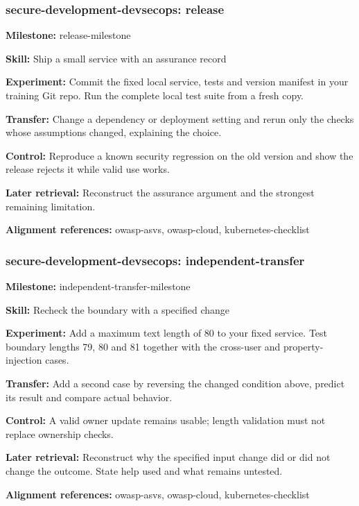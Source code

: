 \subsubsection{secure-development-devsecops: release}
\noindent\textbf{Milestone:} release-milestone\par
\noindent\textbf{Skill:} Ship a small service with an assurance record\par
\noindent\textbf{Experiment:} Commit the fixed local service, tests and version manifest in your training Git repo. Run the complete local test suite from a fresh copy.\par
\noindent\textbf{Transfer:} Change a dependency or deployment setting and rerun only the checks whose assumptions changed, explaining the choice.\par
\noindent\textbf{Control:} Reproduce a known security regression on the old version and show the release rejects it while valid use works.\par
\noindent\textbf{Later retrieval:} Reconstruct the assurance argument and the strongest remaining limitation.\par
\noindent\textbf{Alignment references:} owasp-asvs, owasp-cloud, kubernetes-checklist\par
\subsubsection{secure-development-devsecops: independent-transfer}
\noindent\textbf{Milestone:} independent-transfer-milestone\par
\noindent\textbf{Skill:} Recheck the boundary with a specified change\par
\noindent\textbf{Experiment:} Add a maximum text length of 80 to your fixed service. Test boundary lengths 79, 80 and 81 together with the cross-user and property-injection cases.\par
\noindent\textbf{Transfer:} Add a second case by reversing the changed condition above, predict its result and compare actual behavior.\par
\noindent\textbf{Control:} A valid owner update remains usable; length validation must not replace ownership checks.\par
\noindent\textbf{Later retrieval:} Reconstruct why the specified input change did or did not change the outcome. State help used and what remains untested.\par
\noindent\textbf{Alignment references:} owasp-asvs, owasp-cloud, kubernetes-checklist\par
